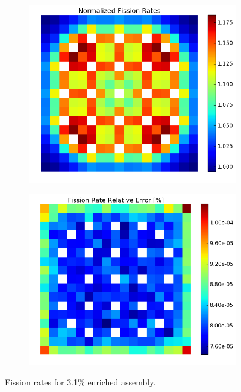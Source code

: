\begin{figure}[h!]
\centering
\begin{subfigure}{0.5\textwidth}
  \centering
  \includegraphics[width=\linewidth]{figures/benchmarks/fission-rates/fiss-mean-fuel-31}
  \caption{}
  \label{fig:chap7-fiss-rate-mean-3.1-assm}
\end{subfigure}%
\begin{subfigure}{0.5\textwidth}
  \centering
  \includegraphics[width=\linewidth]{figures/benchmarks/fission-rates/fiss-rel-err-fuel-31}
  \caption{}
  \label{fig:chap7-fiss-rate-rel-err-3.1-assm}
\end{subfigure}%
\caption[Fission rates for 3.1\% enriched assembly]{Fission rates for 3.1\% enriched assembly.}
\label{fig:chap7-fiss-rates-3.1-assm}
\end{figure}

